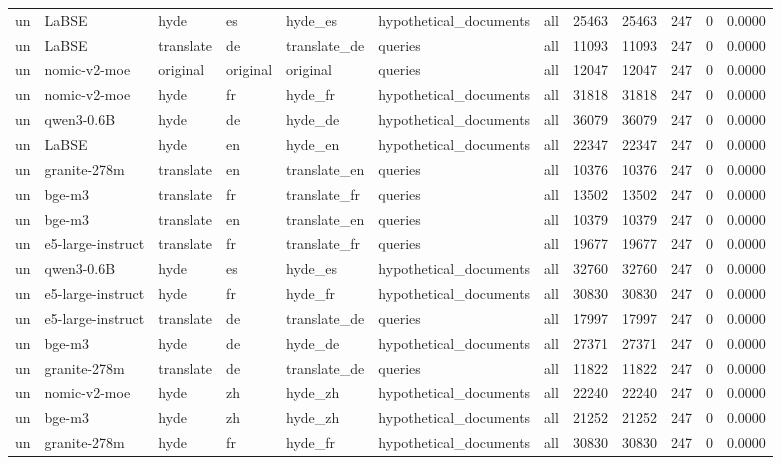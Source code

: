 \begin{tabular}{lllllllrrrrr}
un & LaBSE & hyde & es & hyde\_es & hypothetical\_documents & all & 25463 & 25463 & 247 & 0 & 0.0000 \\
un & LaBSE & translate & de & translate\_de & queries & all & 11093 & 11093 & 247 & 0 & 0.0000 \\
un & nomic-v2-moe & original & original & original & queries & all & 12047 & 12047 & 247 & 0 & 0.0000 \\
un & nomic-v2-moe & hyde & fr & hyde\_fr & hypothetical\_documents & all & 31818 & 31818 & 247 & 0 & 0.0000 \\
un & qwen3-0.6B & hyde & de & hyde\_de & hypothetical\_documents & all & 36079 & 36079 & 247 & 0 & 0.0000 \\
un & LaBSE & hyde & en & hyde\_en & hypothetical\_documents & all & 22347 & 22347 & 247 & 0 & 0.0000 \\
un & granite-278m & translate & en & translate\_en & queries & all & 10376 & 10376 & 247 & 0 & 0.0000 \\
un & bge-m3 & translate & fr & translate\_fr & queries & all & 13502 & 13502 & 247 & 0 & 0.0000 \\
un & bge-m3 & translate & en & translate\_en & queries & all & 10379 & 10379 & 247 & 0 & 0.0000 \\
un & e5-large-instruct & translate & fr & translate\_fr & queries & all & 19677 & 19677 & 247 & 0 & 0.0000 \\
un & qwen3-0.6B & hyde & es & hyde\_es & hypothetical\_documents & all & 32760 & 32760 & 247 & 0 & 0.0000 \\
un & e5-large-instruct & hyde & fr & hyde\_fr & hypothetical\_documents & all & 30830 & 30830 & 247 & 0 & 0.0000 \\
un & e5-large-instruct & translate & de & translate\_de & queries & all & 17997 & 17997 & 247 & 0 & 0.0000 \\
un & bge-m3 & hyde & de & hyde\_de & hypothetical\_documents & all & 27371 & 27371 & 247 & 0 & 0.0000 \\
un & granite-278m & translate & de & translate\_de & queries & all & 11822 & 11822 & 247 & 0 & 0.0000 \\
un & nomic-v2-moe & hyde & zh & hyde\_zh & hypothetical\_documents & all & 22240 & 22240 & 247 & 0 & 0.0000 \\
un & bge-m3 & hyde & zh & hyde\_zh & hypothetical\_documents & all & 21252 & 21252 & 247 & 0 & 0.0000 \\
un & granite-278m & hyde & fr & hyde\_fr & hypothetical\_documents & all & 30830 & 30830 & 247 & 0 & 0.0000 \\

\end{tabular}
